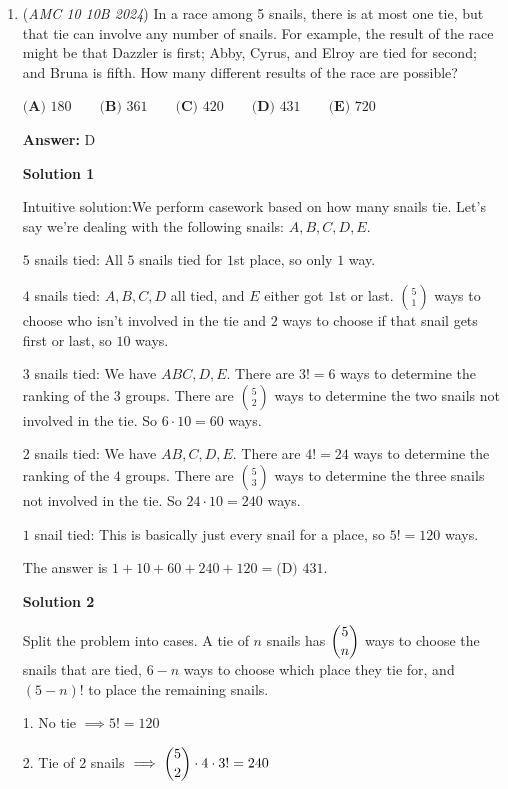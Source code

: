 \begin{enumerate}
 


	\item (\textit{AMC 10 10B 2024}) In a race among 5 snails, there is at most one tie, but that tie can involve any number
of snails. For example, the result of the race might be that Dazzler is first; Abby,
Cyrus, and Elroy are tied for second; and Bruna is fifth. How many different results
of the race are possible?


 $\textbf{(A) } 180 \qquad\textbf{(B) } 361 \qquad\textbf{(C) } 420 \qquad\textbf{(D) } 431 \qquad\textbf{(E) } 720$

 \textbf{Answer: }D



\textbf{Solution 1}

Intuitive solution:We perform casework based on how many snails tie. Let's say we're dealing with the following snails: $A,B,C,D,E$.

 $5$ snails tied: All $5$ snails tied for $1$st place, so only $1$ way.

 $4$ snails tied: $A,B,C,D$ all tied, and $E$ either got $1$st or last. ${5}\choose{1}$ ways to choose who isn't involved in the tie and $2$ ways to choose if that snail gets first or last, so $10$ ways.

 $3$ snails tied: We have $ABC, D, E$. There are $3! = 6$ ways to determine the ranking of the $3$ groups. There are $5\choose2$ ways to determine the two snails not involved in the tie. So $6 \cdot 10 = 60$ ways.

 $2$ snails tied: We have $AB, C, D, E$. There are $4! = 24$ ways to determine the ranking of the $4$ groups. There are $5\choose{3}$ ways to determine the three snails not involved in the tie. So $24 \cdot 10 = 240$ ways.

 $1$ snail tied: This is basically just every snail for a place, so $5! = 120$ ways.

 The answer is $1+10+60+240+120 = \boxed{\text{(D) }431}$.

 



\textbf{Solution 2}

Split the problem into cases. A tie of $n$ snails has $\dbinom{5}{n}$ ways to choose the snails that are tied, $6-n$ ways to choose which place they tie for, and $(5-n)!$ to place the remaining snails.

 1. No tie $\implies5!=120$

 2. Tie of 2 snails $\implies\dbinom{5}{2}\cdot4\cdot3!=240$


\end{enumerate}
